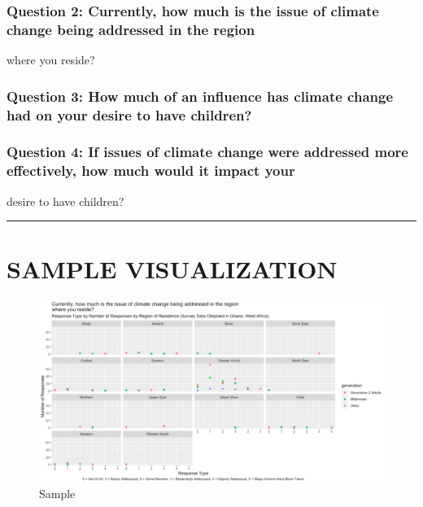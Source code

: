 \documentclass[
]{article}
\begin{document}
\hypertarget{question-2-currently-how-much-is-the-issue-of-climate-change-being-addressed-in-the-region}{%
\subsubsection{Question 2: Currently, how much is the issue of climate
change being addressed in the
region}\label{question-2-currently-how-much-is-the-issue-of-climate-change-being-addressed-in-the-region}}

where you reside?

\hypertarget{question-3-how-much-of-an-influence-has-climate-change-had-on-your-desire-to-have-children}{%
\subsubsection{Question 3: How much of an influence has climate change
had on your desire to have
children?}\label{question-3-how-much-of-an-influence-has-climate-change-had-on-your-desire-to-have-children}}

\hypertarget{question-4-if-issues-of-climate-change-were-addressed-more-effectively-how-much-would-it-impact-your}{%
\subsubsection{Question 4: If issues of climate change were addressed
more effectively, how much would it impact
your}\label{question-4-if-issues-of-climate-change-were-addressed-more-effectively-how-much-would-it-impact-your}}

desire to have children?

\begin{center}\rule{0.5\linewidth}{0.5pt}\end{center}

\hypertarget{sample-visualization}{%
\section{SAMPLE VISUALIZATION}\label{sample-visualization}}

\begin{figure}
\centering
\includegraphics{Sample.png}
\caption{Sample}
\end{figure}
\end{document}
